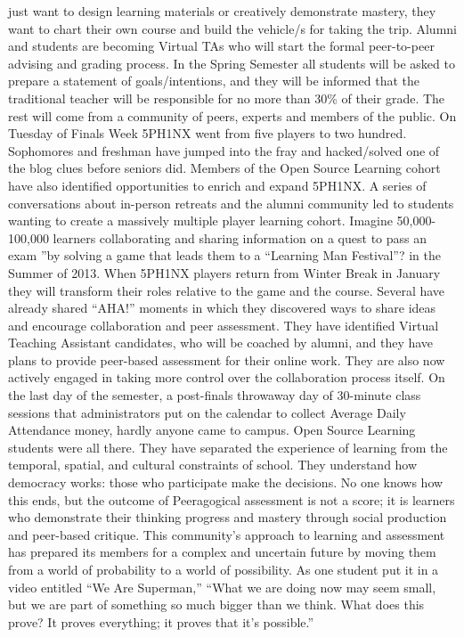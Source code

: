 just want to design learning materials or creatively demonstrate
mastery, they want to chart their own course and build the vehicle/s for
taking the trip. Alumni and students are becoming Virtual TAs who will
start the formal peer-to-peer advising and grading process. In the
Spring Semester all students will be asked to prepare a statement of
goals/intentions, and they will be informed that the traditional teacher
will be responsible for no more than 30\% of their grade. The rest will
come from a community of peers, experts and members of the public. On
Tuesday of Finals Week 5PH1NX went from five players to two hundred.
Sophomores and freshman have jumped into the fray and hacked/solved one
of the blog clues before seniors did. Members of the Open Source
Learning cohort have also identified opportunities to enrich and expand
5PH1NX. A series of conversations about in-person retreats and the
alumni community led to students wanting to create a massively multiple
player learning cohort. Imagine 50,000-100,000 learners collaborating
and sharing information on a quest to pass an exam ''by solving a game
that leads them to a ``Learning Man Festival''? in the Summer of 2013.
When 5PH1NX players return from Winter Break in January they will
transform their roles relative to the game and the course. Several have
already shared ``AHA!'' moments in which they discovered ways to share
ideas and encourage collaboration and peer assessment. They have
identified Virtual Teaching Assistant candidates, who will be coached by
alumni, and they have plans to provide peer-based assessment for their
online work. They are also now actively engaged in taking more control
over the collaboration process itself. On the last day of the semester,
a post-finals throwaway day of 30-minute class sessions that
administrators put on the calendar to collect Average Daily Attendance
money, hardly anyone came to campus. Open Source Learning students were
all there. They have separated the experience of learning from the
temporal, spatial, and cultural constraints of school. They understand
how democracy works: those who participate make the decisions. No one
knows how this ends, but the outcome of Peeragogical assessment is not a
score; it is learners who demonstrate their thinking progress and
mastery through social production and peer-based critique. This
community's approach to learning and assessment has prepared its members
for a complex and uncertain future by moving them from a world of
probability to a world of possibility. As one student put it in a video
entitled ``We Are Superman,'' ``What we are doing now may seem small,
but we are part of something so much bigger than we think. What does
this prove? It proves everything; it proves that it's possible.''

